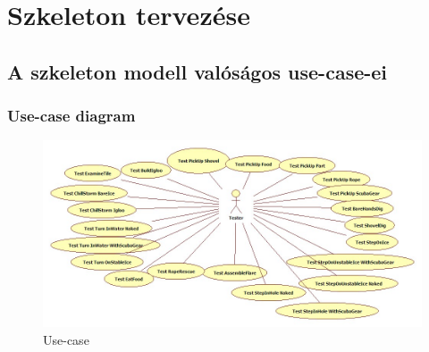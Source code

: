 %
\chapter{Szkeleton tervezése}

\thispagestyle{fancy}

\section{A szkeleton modell valóságos use-case-ei}

\subsection{Use-case diagram}

\begin{figure}[h]
\begin{center}
\includegraphics[width=17cm]{chapters/chapter05/diagrams/TesztUseCase.jpg}
\caption{Use-case}
\label{fig:SzkeletonUseCase}
\end{center}
\end{figure}

